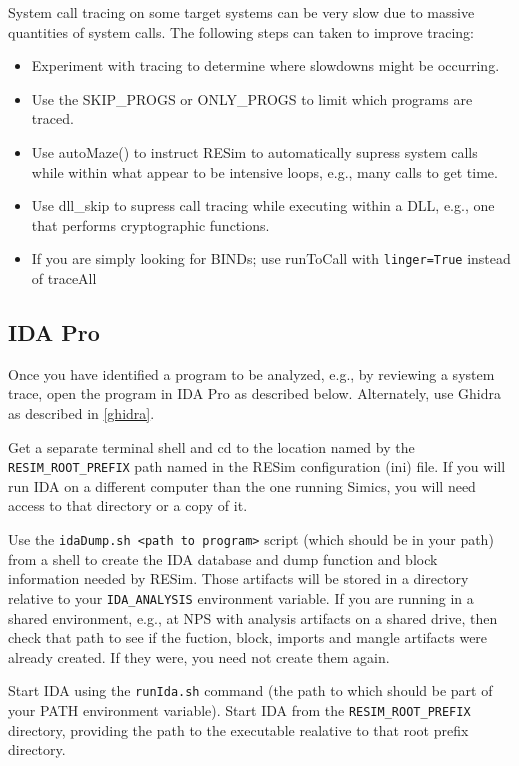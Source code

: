 \documentclass[titlepage]{article}
\begin{document}
System call tracing on some target systems can be very slow due to massive quantities of system calls.  The following steps can taken to improve tracing:

\begin{itemize}
\item Experiment with tracing to determine where slowdowns might be occurring.
\item Use the SKIP\_PROGS or ONLY\_PROGS to limit which programs are traced.
\item Use autoMaze() to instruct RESim to automatically supress system calls while within what appear to be intensive loops, e.g., many calls to get time.
\item Use dll\_skip to supress call tracing while executing within a DLL, e.g., one that performs cryptographic functions.
\item If you are simply looking for BINDs; use runToCall with {\tt linger=True} instead of traceAll
\end{itemize}



\subsection{IDA Pro}
\label{ida}
Once you have identified a program to be analyzed, e.g., by reviewing a system trace, open the program in IDA Pro as described below.
Alternately, use Ghidra as described in \ref{ghidra}.

Get a separate terminal shell and cd to the location named by the {\tt RESIM\_ROOT\_PREFIX} path named in the RESim configuration (ini) file.  
If you will run IDA on a different computer than the one running Simics, you will need access to that directory or a copy of it.

Use the {\tt idaDump.sh <path to program>} script (which should be in your path) from a shell to create the IDA database and dump function and block information
needed by RESim.  Those artifacts will be stored in a directory relative to your {\tt IDA\_ANALYSIS} environment variable.
If you are running in a shared environment, e.g., at NPS with analysis artifacts on a shared drive, then 
check that path to see if the fuction, block, imports and mangle artifacts were already created.  If they were, you need not create them again.

Start IDA using the {\tt runIda.sh} command (the path to which should be part of your PATH environment variable).  Start IDA from the
{\tt RESIM\_ROOT\_PREFIX} directory, providing the path to the executable realative to that root prefix directory.
\end{document}
